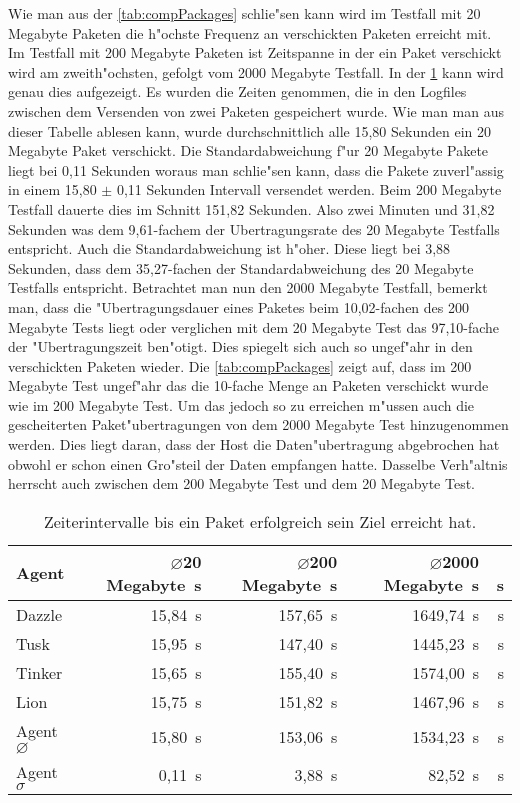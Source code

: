 Wie man aus der \cref{tab:compPackages} schlie"sen kann wird im Testfall mit 20 Megabyte Paketen %
die h"ochste Frequenz an verschickten Paketen erreicht mit. Im Testfall mit 200 Megabyte Paketen %
ist Zeitspanne in der ein Paket verschickt wird am zweith"ochsten, gefolgt vom 2000 Megabyte %
Testfall. In der \cref{tab:compZeiten} kann wird genau dies aufgezeigt. Es wurden die Zeiten %
genommen, die in den Logfiles zwischen dem Versenden von zwei Paketen gespeichert wurde. Wie man man aus %
dieser Tabelle ablesen kann, wurde durchschnittlich alle 15,80 Sekunden ein 20 Megabyte %
Paket verschickt. Die Standardabweichung f"ur 20 Megabyte Pakete liegt bei 0,11 Sekunden %
woraus man schlie"sen kann, dass die Pakete zuverl"assig in einem 15,80 $\pm$ 0,11 Sekunden Intervall versendet %
werden. Beim 200 Megabyte Testfall dauerte dies im Schnitt 151,82 Sekunden. Also zwei Minuten und 31,82 Sekunden %
was dem 9,61-fachem der Ubertragungsrate des 20 Megabyte Testfalls entspricht. Auch die Standardabweichung ist h"oher. %
Diese liegt bei 3,88 Sekunden, dass dem 35,27-fachen der Standardabweichung des 20 Megabyte Testfalls %
entspricht. Betrachtet man nun den 2000 Megabyte Testfall, bemerkt man, dass die "Ubertragungsdauer eines Paketes %
beim 10,02-fachen des 200 Megabyte Tests liegt oder verglichen mit dem 20 Megabyte Test das 97,10-fache der %
"Ubertragungszeit ben"otigt. Dies spiegelt sich auch so ungef"ahr in den verschickten Paketen wieder. %
Die \cref{tab:compPackages} zeigt auf, dass im 200 Megabyte Test ungef"ahr das die 10-fache Menge an Paketen verschickt wurde wie im 200 Megabyte Test. %
Um das jedoch so zu erreichen m"ussen %
auch die gescheiterten Paket"ubertragungen von dem 2000 Megabyte Test hinzugenommen werden. Dies liegt daran, dass der Host %
die Daten"ubertragung abgebrochen hat obwohl er schon einen Gro"steil der Daten empfangen hatte. Dasselbe Verh"altnis herrscht auch zwischen dem 200 Megabyte Test und %
dem 20 Megabyte Test.  

\begin{table}
\centering
\begin{tabular}{l%
 r<{\,s}%
 r<{\,s}%
 r<{\,s}%
 r<{\,s}%
}
Agent  				& $\diameter $20 Megabyte		& $\diameter $200 Megabyte		& $\diameter $2000 Megabyte		\\
\hline
Dazzle 				& 15,84			 		& 157,65				& 1649,74					\\
Tusk 				& 15,95					& 147,40				& 1445,23				\\
Tinker				& 15,65					& 155,40				& 1574,00				\\
Lion				& 15,75					& 151,82				& 1467,96				\\ 
Agent $\diameter $  		& 15,80					& 153,06			 	& 1534,23				\\   
Agent $\sigma $			& 0,11		 			& 3,88					& 82,52      				\\
\end{tabular}
\caption{Zeiterintervalle bis ein Paket erfolgreich sein Ziel erreicht hat.}
\label{tab:compZeiten}
\end{table}

